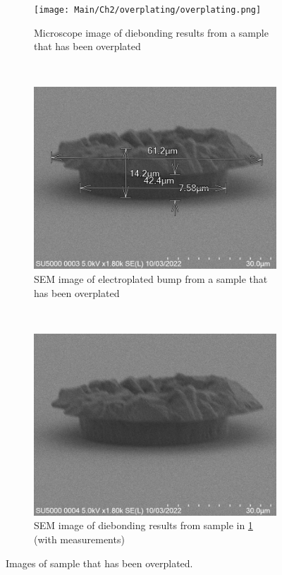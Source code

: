 \begin{figure}
    \centering
    \begin{subfigure}[t]{0.3\textwidth}
        \texttt{[image: Main/Ch2/overplating/overplating.png]}
        \caption{Microscope image of diebonding results from a sample that has been overplated}
    \end{subfigure}
    ~
    \begin{subfigure}[t]{0.3\textwidth}
        \includegraphics[width=\textwidth]{Main/Ch2/overplating/overplating-sem1.png}
        \caption{SEM image of electroplated bump from a sample that has been overplated}
        \label{fig:not-measured}
    \end{subfigure}
    ~
    \begin{subfigure}[t]{0.3\textwidth}
        \includegraphics[width=\textwidth]{Main/Ch2/overplating/overplating-sem2.png}
        \caption{SEM image of diebonding results from sample in \ref{fig:not-measured} (with measurements)}
    \end{subfigure}
    \caption{Images of sample that has been overplated.}
    \label{fig:overplating}
\end{figure}

